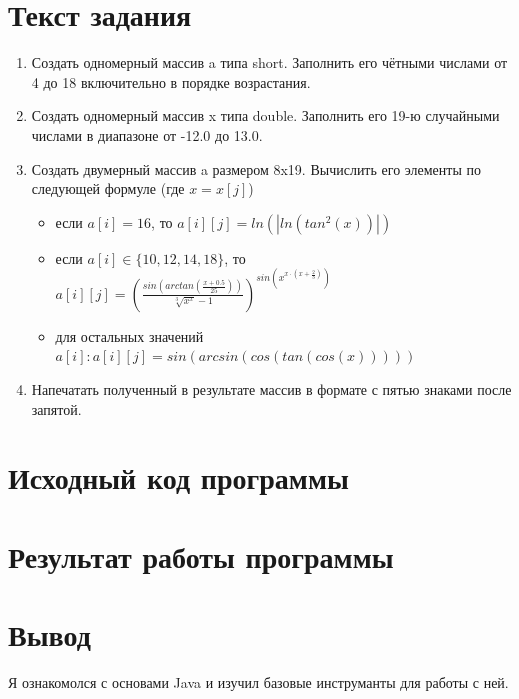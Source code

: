 \documentclass{article}
\begin{document}

\section*{Текст задания}

\begin{enumerate}
  \item Создать одномерный массив a типа short. Заполнить его чётными числами от 4 до 18 включительно в порядке возрастания.
  \item Создать одномерный массив x типа double. Заполнить его 19-ю случайными числами в диапазоне от -12.0 до 13.0.
  \item Создать двумерный массив a размером 8x19. Вычислить его элементы по следующей формуле (где $x = x[j]$) \begin{itemize}
          \item если $a[i] = 16$, то $a[i][j] = ln(|ln(tan^2(x))|)$
          \item если $a[i] \in \{10, 12, 14, 18\}$, то $
                  a[i][j] = \left(
                  \frac{
                    sin\left(arctan\left(\frac{x+0.5}{25}\right)\right)
                  }{
                    \sqrt[3]{x^x}-1
                  }
                  \right)^{
                    sin\left(x^{x\cdot\left(x+\frac{2}{3}\right)}\right)
                  }
                $
          \item для остальных значений $a[i]: a[i][j]=sin(arcsin(cos(tan(cos(x)))))$
        \end{itemize}
  \item Напечатать полученный в результате массив в формате с пятью знаками после запятой.
\end{enumerate}

\section*{Исходный код программы}


\section*{Результат работы программы}


\section*{Вывод}
Я ознакомолся с основами Java и изучил базовые инструманты для работы с ней.
\end{document}
